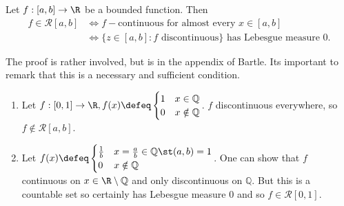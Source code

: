 \begin{theorem}
    Let $f : [a, b] \to \R$ be a bounded function. Then \begin{align*}
    f \in \mathcal{R}[a, b] &\iff f-\text{continuous for almost every } x \in [a, b]\\
    &\iff \{z \in [a, b] : f \text{ discontinuous}\} \text{ has Lebesgue measure 0}.
    \end{align*}
\end{theorem}

\begin{remark}
    The proof is rather involved, but is in the appendix of Bartle. Its important to remark that this is a necessary and sufficient condition.
\end{remark}

\begin{example}
    \begin{enumerate}
        \item Let $f :[0, 1] \to \R, f(x) \defeq \begin{cases}
            1 & x \in \mathbb{Q}\\
            0 & x \notin \mathbb{Q}
        \end{cases}$. $f$ discontinuous everywhere, so $f \notin \mathcal{R}[a, b]$.
        \item Let $f(x) \defeq \begin{cases}
            \frac{1}{b} & x = \frac{a}{b} \in \mathbb{Q} \st (a, b) = 1\\
            0 & x \notin \mathbb{Q}
        \end{cases}$. One can show that $f$ continuous on $x \in \R\setminus \mathbb{Q}$ and only discontinuous on $\mathbb{Q}$. But this is a countable set so certainly has Lebesgue measure 0 and so $f \in \mathcal{R}[0, 1]$.
    \end{enumerate}
\end{example}